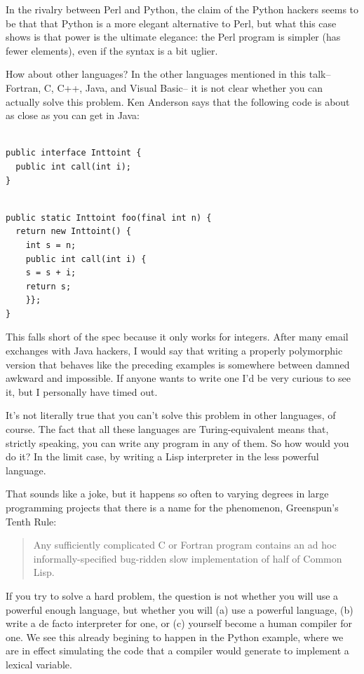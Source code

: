 \documentclass[12pt]{book}
\begin{document}
In the rivalry between Perl and Python, the claim of the Python hackers
seems to be that that Python is a more elegant alternative to Perl, but
what this case shows is that power is the ultimate elegance: the Perl
program is simpler (has fewer elements), even if the syntax is a bit
uglier.

How about other languages? In the other languages mentioned in this
talk-- Fortran, C, C++, Java, and Visual Basic-- it is not clear whether
you can actually solve this problem. Ken Anderson says that the
following code is about as close as you can get in Java:

\begin{verbatim}

public interface Inttoint {
  public int call(int i);
}
\end{verbatim}

\begin{verbatim}

public static Inttoint foo(final int n) {
  return new Inttoint() {
    int s = n;
    public int call(int i) {
    s = s + i;
    return s;
    }};
}
\end{verbatim}

This falls short of the spec because it only works for integers. After
many email exchanges with Java hackers, I would say that writing a
properly polymorphic version that behaves like the preceding examples is
somewhere between damned awkward and impossible. If anyone wants to
write one I'd be very curious to see it, but I personally have timed
out.

It's not literally true that you can't solve this problem in other
languages, of course. The fact that all these languages are
Turing-equivalent means that, strictly speaking, you can write any
program in any of them. So how would you do it? In the limit case, by
writing a Lisp interpreter in the less powerful language.

That sounds like a joke, but it happens so often to varying degrees in
large programming projects that there is a name for the phenomenon,
Greenspun's Tenth Rule:

\begin{quote}
Any sufficiently complicated C or Fortran program contains an ad hoc
informally-specified bug-ridden slow implementation of half of Common
Lisp.
\end{quote}

If you try to solve a hard problem, the question is not whether you will
use a powerful enough language, but whether you will (a) use a powerful
language, (b) write a de facto interpreter for one, or (c) yourself
become a human compiler for one. We see this already begining to happen
in the Python example, where we are in effect simulating the code that a
compiler would generate to implement a lexical variable.
\end{document}
